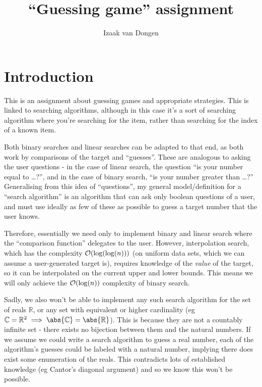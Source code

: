 \documentclass[fleqn,a4paper,11pt]{article}
\title{``Guessing game'' assignment}
\author{Izaak van Dongen}
\begin{document}
    \maketitle\thispagestyle{empty} %
    \tableofcontents
    \lstlistoflistings
    \listoffigures

    \section{Introduction}

    This is an assignment about guessing games and appropriate strategies. This
    is linked to searching algorithms, although in this case it's a sort of
    searching algorithm where you're searching for the item, rather than
    searching for the index of a known item.

    Both binary searches and linear searches can be adapted to that end, as both
    work by comparisons of the target and ``guesses''. These are analogous to
    asking the user questions - in the case of linear search, the question ``is
    your number equal to \ldots?'', and in the case of binary search, ``is your
    number greater than \ldots?'' Generalising from this idea of ``questions'',
    my general model/definition for a ``search algorithm'' is an algorithm that
    can ask only boolean questions of a user, and must use ideally as few of
    these as possible to guess a target number that the user knows.

    Therefore, essentially we need only to implement binary and linear search
    where the ``comparison function'' delegates to the user.  However,
    interpolation search, which has the complexity \(\operatorname{\mathcal O}(\log(\log(n)))\) (on
    uniform data sets, which we can assume a user-generated target is), requires
    knowledge of the \emph{value} of the target, so it can be interpolated on
    the current upper and lower bounds. This means we will only achieve the
    \(\operatorname{\mathcal O}(\log(n))\) complexity of binary search.

    Sadly, we also won't be able to implement any such search algorithm for the
    set of reals \(\mathbb{R}\), or any set with equivalent or higher cardinality
    (eg \(\mathbb{C} = \mathbb{R}^2 \implies \abs{\mathbb{C}} =
    \abs{\mathbb{R}}\)). This is because they are not a countably infinite set -
    there exists no bijection between them and the natural numbers. If we assume
    we could write a search algorithm to guess a real number, each of the
    algorithm's guesses could be labeled with a natural number, implying there
    does exist some enumeration of the reals. This contradicts lots of
    established knowledge (eg Cantor's diagonal argument) and so we know this
    won't be possible.
\end{document}
